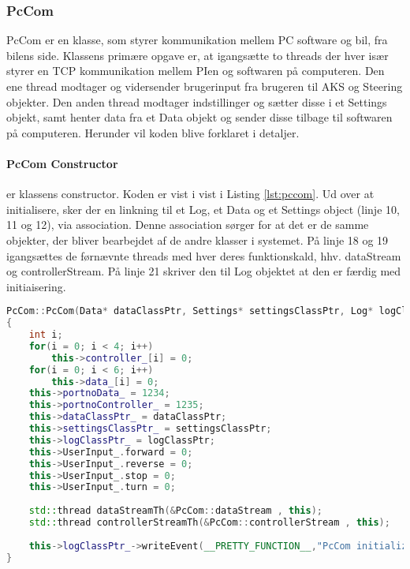 \subsubsection{PcCom} \label{sec:pccom_impl}

PcCom er en klasse, som styrer kommunikation mellem PC software og bil, fra bilens side. Klassens primære opgave er, at igangsætte to threads der hver især styrer en TCP kommunikation mellem PIen og softwaren på computeren. Den ene thread modtager og vidersender brugerinput fra brugeren til AKS og Steering objekter. Den anden thread modtager indstillinger og sætter disse i et Settings objekt, samt henter data fra et Data objekt og sender disse tilbage til softwaren på computeren.
Herunder vil koden blive forklaret i detaljer.


\paragraph{PcCom Constructor} er klassens constructor. Koden er vist i vist i Listing \ref{lst:pccom}. Ud over at initialisere, sker der en linkning til et Log, et Data og et Settings object (linje 10, 11 og 12), via association. Denne association sørger for at det er de samme objekter, der bliver bearbejdet af de andre klasser i systemet. På linje 18 og 19 igangsættes de førnævnte threads med hver deres funktionskald, hhv. dataStream og controllerStream. På linje 21 skriver den til Log objektet at den er færdig med initiaisering.

\begin{lstlisting}[caption={PcCom Constructor},label=lst:pccom, language=c++]
PcCom::PcCom(Data* dataClassPtr, Settings* settingsClassPtr, Log* logClassPtr)
{
    int i;
    for(i = 0; i < 4; i++)
        this->controller_[i] = 0;
    for(i = 0; i < 6; i++)
        this->data_[i] = 0;
    this->portnoData_ = 1234;
    this->portnoController_ = 1235;
    this->dataClassPtr_ = dataClassPtr;
    this->settingsClassPtr_ = settingsClassPtr;
    this->logClassPtr_ = logClassPtr;
    this->UserInput_.forward = 0;
    this->UserInput_.reverse = 0;
    this->UserInput_.stop = 0;
    this->UserInput_.turn = 0;
    
    std::thread dataStreamTh(&PcCom::dataStream , this);
    std::thread controllerStreamTh(&PcCom::controllerStream , this);
    
    this->logClassPtr_->writeEvent(__PRETTY_FUNCTION__,"PcCom initialized");
}
\end{lstlisting}



